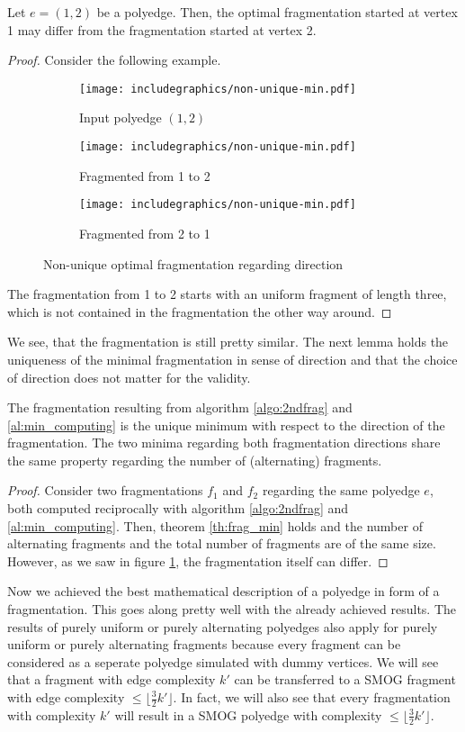 \begin{lemma}
	Let $e = (1,2)$ be a polyedge. Then, the optimal fragmentation started at vertex 1 may differ from the fragmentation started at vertex 2.
\end{lemma}
\begin{proof}
	Consider the following example.
	\begin{figure}[H]
		\centering
		\begin{subfigure}{0.3\textwidth}
			\centering
			\texttt{[image: includegraphics/non-unique-min.pdf]}
			\caption{Input polyedge $(1,2)$}
		\end{subfigure}
		\begin{subfigure}{0.3\textwidth}
			\centering
			\texttt{[image: includegraphics/non-unique-min.pdf]}
			\caption{Fragmented from 1 to 2}
		\end{subfigure}
		\begin{subfigure}{0.3\textwidth}
			\centering
			\texttt{[image: includegraphics/non-unique-min.pdf]}
			\caption{Fragmented from 2 to 1}
		\end{subfigure}
	\caption{Non-unique optimal fragmentation regarding direction}\label{im:non-unique-min}
	\end{figure}
The fragmentation from 1 to 2 starts with an uniform fragment of length three, which is not contained in the fragmentation the other way around.
\end{proof}
We see, that the fragmentation is still pretty similar. The next lemma holds the uniqueness of the minimal fragmentation in sense of direction and that the choice of direction does not matter for the validity.
\begin{lemma}
	The fragmentation resulting from algorithm \ref{algo:2ndfrag} and \ref{al:min_computing} is the unique minimum with respect to the direction of the fragmentation. The two minima regarding both fragmentation directions share the same property regarding the number of (alternating) fragments.
\end{lemma}
\begin{proof}
	Consider two fragmentations $f_1$ and $f_2$ regarding the same polyedge $e$, both computed reciprocally with algorithm \ref{algo:2ndfrag} and \ref{al:min_computing}. Then, theorem \ref{th:frag_min} holds and the number of alternating fragments and the total number of fragments are of the same size. However, as we saw in figure \ref{im:non-unique-min}, the fragmentation itself can differ. 
\end{proof}
Now we achieved the best mathematical description of a polyedge in form of a fragmentation. This goes along pretty well with the already achieved results. The results of purely uniform or purely alternating polyedges also apply for purely uniform or purely alternating fragments because every fragment can be considered as a seperate polyedge simulated with dummy vertices. We will see that a fragment with edge complexity $k'$ can be transferred to a SMOG fragment with edge complexity $\leq \lfloor\frac{3}{2}k'\rfloor$. In fact, we will also see that every fragmentation with complexity $k'$ will result in a SMOG polyedge with complexity $\leq \lfloor\frac{3}{2}k'\rfloor$.
